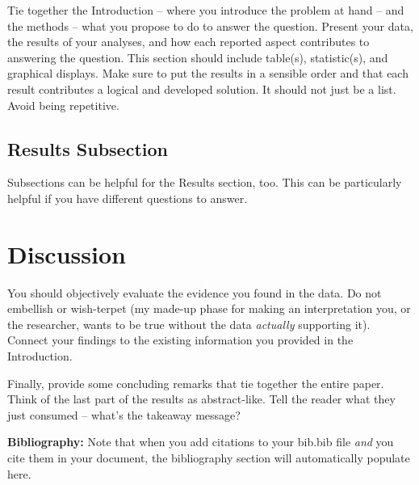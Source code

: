 \documentclass{article}\usepackage[]{graphicx}\usepackage[]{xcolor}
\begin{document}
\begin{multicols}{2}
Tie together the Introduction -- where you introduce the problem at hand -- and the methods --  what you propose to do to answer the question. Present your data, the results of your analyses, and how each reported aspect contributes to answering the question. This section should include table(s), statistic(s), and graphical displays. Make sure to put the results in a sensible order and that each result contributes a logical and developed solution. It should not just be a list. Avoid being repetitive. 

\subsection{Results Subsection}
Subsections can be helpful for the Results section, too. This can be particularly helpful if you have different questions to answer. 


\section{Discussion}
 You should objectively evaluate the evidence you found in the data. Do not embellish or wish-terpet (my made-up phase for making an interpretation you, or the researcher, wants to be true without the data \emph{actually} supporting it). Connect your findings to the existing information you provided in the Introduction.

Finally, provide some concluding remarks that tie together the entire paper. Think of the last part of the results as abstract-like. Tell the reader what they just consumed -- what's the takeaway message?

\vspace{2em}

\noindent\textbf{Bibliography:} Note that when you add citations to your bib.bib file \emph{and}
you cite them in your document, the bibliography section will automatically populate here.

\begin{tiny}

\end{tiny}
\end{multicols}

\newpage
\onecolumn
\end{document}
